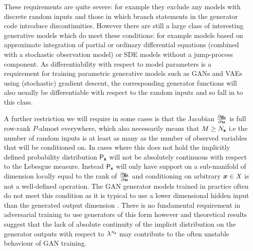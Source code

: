 These requirements are quite severe: for example they exclude any models with discrete random inputs and those in which branch statements in the generator code introduce discontinuities. However there are still a large class of interesting generative models which do meet these conditions: for example models based on approximate integration of partial or ordinary differential equations (combined with a stochastic observation model) or \ac{SDE} models without a jump-process component. As differentiability with respect to model parameters is a requirement for training parametric generative models such as \acp{GAN} and \acp{VAE} using (stochastic) gradient descent, the corresponding generator functions will also usually be differentiable with respect to the random inputs and so fall in to this class.

A further restriction we will require in some cases is that the Jacobian $\frac{\partial {\mathbf{g}}_{\boldsymbol{\mathsf{x}}}}{\partial \boldsymbol{u}}$ is full row-rank $P$-almost everywhere, which also necessarily means that $M \geq N_{\boldsymbol{\mathsf{x}}}$ i.e the number of random inputs is at least as many as the number of observed variables that will be conditioned on. In cases where this does not hold the implicitly defined probability distribution $\mathsf{P}_{\boldsymbol{\mathsf{x}}}$ will not be absolutely continuous with respect to the Lebesgue measure. Instead $\mathsf{P}_{\boldsymbol{\mathsf{x}}}$ will only have support on a sub-manifold of dimension locally equal to the rank of $\frac{\partial {\mathbf{g}}_{\boldsymbol{\mathsf{x}}}}{\partial \boldsymbol{u}}$ and conditioning on arbitrary $\boldsymbol{x} \in \mathit{X}$ is not a well-defined operation. The \ac{GAN} generator models trained in practice often do not meet this condition as it is typical to use a lower dimensional hidden input than the generated output dimension \citep{arjovsky2017towards}. There is no fundamental requirement in adversarial training to use generators of this form however and theoretical results \citep{arjovsky2017towards} suggest that the lack of absolute continuity of the implicit distribution on the generator outputs with respect to $\lebm{N_{\rvct{x}}}$ may contribute to the often unstable behaviour of \ac{GAN} training.

